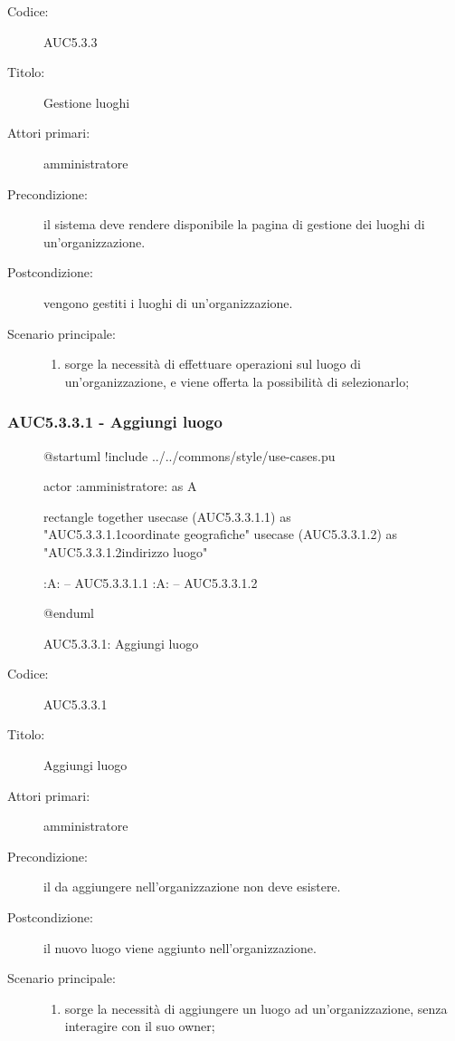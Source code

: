 \documentclass[../../../analisi-dei-requisiti.tex]{subfiles}
\begin{document}
\begin{description}
  \item[Codice:] AUC5.3.3
  \item[Titolo:] Gestione luoghi
  \item[Attori primari:] amministratore
  \item[Precondizione:] il sistema deve rendere disponibile la pagina di gestione dei luoghi di un'organizzazione.
  \item[Postcondizione:] vengono gestiti i luoghi di un'organizzazione.
  \item[Scenario principale:]
  \begin{enumerate}
    \item sorge la necessità di effettuare operazioni sul luogo di un'organizzazione, e viene offerta la possibilità di selezionarlo;
  \end{enumerate}
\end{description}

\subsubsection{AUC5.3.3.1 - Aggiungi luogo}%
\label{subs:AUC5.3.3.1}

\begin{figure}[h!]
  \centering
  \begin{plantuml}
  @startuml
  !include ../../commons/style/use-cases.pu

  actor :amministratore: as A

  rectangle {
    together {
      usecase (AUC5.3.3.1.1) as "AUC5.3.3.1.1\nInserisci coordinate geografiche"
      usecase (AUC5.3.3.1.2) as "AUC5.3.3.1.2\nInserisci indirizzo luogo"
    }
  }

  :A: -- AUC5.3.3.1.1
  :A: -- AUC5.3.3.1.2

  @enduml
  \end{plantuml}
  \caption{AUC5.3.3.1: Aggiungi luogo}
  \label{fig:AUC5_3_3_1}
\end{figure}

\begin{description}
  \item[Codice:] AUC5.3.3.1
  \item[Titolo:] Aggiungi luogo
  \item[Attori primari:] amministratore
  \item[Precondizione:] il  da aggiungere nell'organizzazione non deve esistere.
  \item[Postcondizione:] il nuovo luogo viene aggiunto nell'organizzazione.
  \item[Scenario principale:]
  \begin{enumerate}
    \item sorge la necessità di aggiungere un luogo ad un'organizzazione, senza interagire con il suo owner;
  \end{enumerate}
\end{description}
\end{document}
